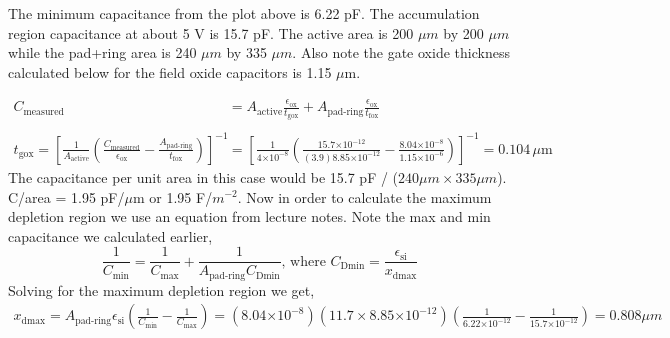 \documentclass{article}
\providecommand{\e}[1]{\ensuremath{\times 10^{#1}}}
\begin{document}
The minimum capacitance from the plot above is 6.22 pF. The accumulation region capacitance at about 5 V is 15.7 pF. The active area is 200 $\mu m$ by 200 $\mu m$ while the pad+ring area is 240 $\mu m$ by 335 $\mu m$. Also note the gate oxide thickness calculated below for the field oxide capacitors is 1.15 $\mu$m.

\begin{align*}
C_{\text{measured}} &= A_{\text{active}}\frac{\epsilon_{\text{ox}}}{t_{\text{gox}}} + A_{\text{pad-ring}}\frac{\epsilon_{\text{ox}}}{t_{\text{fox}}} \\ \\
t_{\text{gox}} = [\frac{1}{A_{\text{active}}}(\frac{C_{\text{measured}}}{\epsilon_{\text{ox}}} - \frac{A_{\text{pad-ring}}}{t_{\text{fox}}})]^{-1} &= [\frac{1}{4\e{-8}}(\frac{15.7\e{-12}}{(3.9)8.85\e{-12}} - \frac{8.04\e{-8}}{1.15\e{-6}})]^{-1} = 0.104 \,\mu\text{m}
\end{align*}
The capacitance per unit area in this case would be 15.7 pF / ($240 \mu m \times 335 \mu m$). C/area = 1.95 pF/$\mu$m or 1.95 F/$m^{-2}$. Now in order to calculate the maximum depletion region we use an equation from lecture notes. Note the max and min capacitance we calculated earlier,
\begin{equation}
\frac{1}{C_{\text{min}}} = \frac{1}{C_{\text{max}}} + \frac{1}{A_{\text{pad-ring}} C_{\text{Dmin}}},\,\text{where } C_{\text{Dmin}} = \frac{\epsilon_{\text{si}}}{x_{\text{dmax}}}
\end{equation}
Solving for the maximum depletion region we get,
\begin{align*}
x_{\text{dmax}} = A_{\text{pad-ring}}\epsilon_{\text{si}}(\frac{1}{C_{\text{min}}} - \frac{1}{C_{\text{max}}}) = (8.04\e{-8})(11.7 \times 8.85\e{-12})(\frac{1}{6.22\e{-12}} - \frac{1}{15.7\e{-12}}) = 0.808 \mu m
\end{align*}
\end{document}
